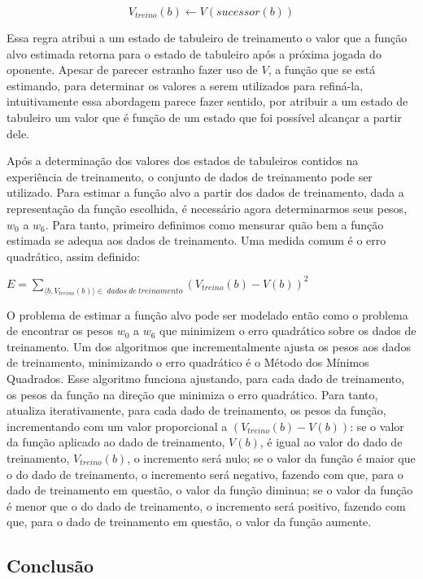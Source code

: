 \begin{equation}
V_{treino}(b) \leftarrow V(sucessor(b))
\label{eq:critico}
\end{equation}

Essa regra atribui a um estado de tabuleiro de treinamento o valor que a função alvo estimada retorna para o estado de tabuleiro após a próxima jogada do oponente. Apesar de parecer estranho fazer uso de $V$, a função que se está estimando, para determinar os valores a serem utilizados para refiná-la, intuitivamente essa abordagem parece fazer sentido, por atribuir a um estado de tabuleiro um valor que é função de um estado que foi possível alcançar a partir dele. 

Após a determinação dos valores dos estados de tabuleiros contidos na experiência de treinamento, o conjunto de dados de treinamento pode ser utilizado. Para estimar a função alvo a partir dos dados de treinamento, dada a representação da função escolhida, é necessário agora determinarmos seus pesos, $w_0$ a $w_6$. Para tanto, primeiro definimos como mensurar quão bem a função estimada se adequa aos dados de treinamento. Uma medida comum é o erro quadrático, assim definido:

$E = \sum\limits_{\langle b, V_{treino}(b) \rangle \in \ dados\ de\ treinamento} {(V_{treino}(b) - V(b))}^2$

O problema de estimar a função alvo pode ser modelado então como o problema de encontrar os pesos $w_0$ a $w_6$ que minimizem o erro quadrático sobre os dados de treinamento. Um dos algoritmos que incrementalmente ajusta os pesos aos dados de treinamento, minimizando o erro quadrático é o Método dos Mínimos Quadrados. Esse algoritmo funciona ajustando, para cada dado de treinamento, os pesos da função na direção que minimiza o erro quadrático. Para tanto, atualiza iterativamente, para cada dado de treinamento, os pesos da função, incrementando com um valor proporcional a $(V_{treino}(b) - V(b))$: se o valor da função aplicado ao dado de treinamento, $V(b)$, é igual ao valor do dado de treinamento, $V_{treino}(b)$, o incremento será nulo; se o valor da função é maior que o do dado de treinamento, o incremento será negativo, fazendo com que, para o dado de treinamento em questão, o valor da função diminua; se o valor da função é menor que o do dado de treinamento, o incremento será positivo, fazendo com que, para o dado de treinamento em questão, o valor da função aumente.

\subsection{Conclusão}

